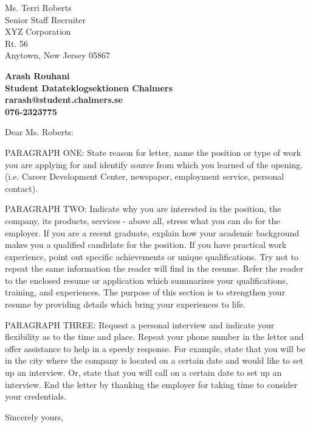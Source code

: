 \documentclass[11pt]{letter} %
\begin{document}
\signature{Andrew Malone}                  %
\longindentation=0pt                       %
\let\raggedleft\raggedright                %
 
\begin{letter}{
Ms. Terri Roberts \\
Senior Staff Recruiter \\
XYZ Corporation \\
Rt. 56 \\
Anytown, New Jersey 05867}

\begin{center}
\large\bf Arash Rouhani\\
Student Datateklogsektionen Chalmers \\
rarash@student.chalmers.se \\
076-2323775 \\
\end{center} 
\vfill %


 
\opening{Dear Ms. Roberts:} 
 
\noindent PARAGRAPH ONE: State reason for letter, name the position or type 
of work you are applying for and identify source from  which  you 
learned   of   the  opening.  (i.e.  Career  Development  Center, 
newspaper, employment service, personal contact). 
 
\noindent PARAGRAPH  TWO:  Indicate why you are interested in the position, 
the company, its products, services - above all, stress what you 
can  do  for  the employer. If you are a recent graduate, explain  how
your academic background makes you a qualified candidate for the
position. If  you have practical work experience, point out 
specific achievements or unique qualifications. Try not to repeat 
the  same  information  the reader will find in the resume. Refer 
the reader to the enclosed resume or application which summarizes 
your  qualifications,  training,  and experiences. The purpose of 
this section is to strengthen your resume  by  providing  details 
which bring your experiences to life. 
 
\noindent PARAGRAPH THREE: Request a personal interview and  indicate  your 
flexibility as to the time and place. Repeat your phone number in 
the letter and offer assistance to help in a speedy response. For 
example,  state that you will be in the city where the company is 
located on a certain date and would like to set up an  interview. 
Or,  state  that  you  will  call  on a certain date to set up an 
interview. End the letter by thanking  the  employer  for  taking 
time to consider your credentials. 
 
\closing{Sincerely yours,}
 
 
\encl{}  				%

\end{letter}
 
\end{document}
